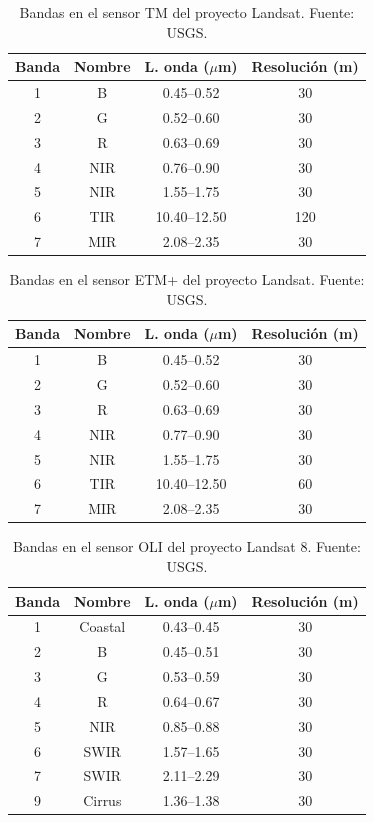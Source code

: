 \begin{table}
	\centering
	\begin{tabular}{@{}cccc@{}}
		\toprule[0.4mm]
		Banda & Nombre & L. onda ($\mu$m) & Resolución (m)\\
		\midrule
		1 & B & 0.45--0.52 & 30 \\
		2 & G & 0.52--0.60 & 30 \\
		3 & R & 0.63--0.69 & 30 \\
		4 & NIR & 0.76--0.90 & 30 \\
		5 & NIR & 1.55--1.75 & 30 \\
		6 & TIR & 10.40--12.50 & 120 \\
		7 & MIR & 2.08--2.35 & 30 \\
		\bottomrule[0.4mm]
	\end{tabular}
	\caption[Bandas en el sensor TM]{Bandas en el sensor TM del proyecto Landsat. Fuente: USGS.}
	\label{tab:sensoresTM}
\end{table}

\begin{table}
	\centering
	\begin{tabular}{@{}cccc@{}}
		\toprule[0.4mm]
		Banda & Nombre & L. onda ($\mu$m) & Resolución (m)\\
		\midrule
		1 & B & 0.45--0.52 & 30 \\
		2 & G & 0.52--0.60 & 30 \\
		3 & R & 0.63--0.69 & 30 \\
		4 & NIR & 0.77--0.90 & 30 \\
		5 & NIR & 1.55--1.75 & 30 \\
		6 & TIR & 10.40--12.50 & 60 \\
		7 & MIR & 2.08--2.35 & 30 \\
		\bottomrule[0.4mm]
	\end{tabular}
	\caption[Bandas en el sensor ETM+]{Bandas en el sensor ETM+ del proyecto Landsat. Fuente: USGS.}
	\label{tab:sensoresETM}
\end{table}

\begin{table}
	\centering
	\begin{tabular}{@{}cccc@{}}
		\toprule[0.4mm]
		Banda & Nombre & L. onda ($\mu$m) & Resolución (m)\\
		\midrule
		1 & Coastal & 0.43--0.45 & 30 \\
		2 & B & 0.45--0.51 & 30 \\
		3 & G & 0.53--0.59 & 30 \\
		4 & R & 0.64--0.67 & 30 \\
		5 & NIR & 0.85--0.88 & 30 \\
		6 & SWIR & 1.57--1.65 & 30 \\
		7 & SWIR & 2.11--2.29 & 30 \\
		9 & Cirrus & 1.36--1.38 & 30 \\
		\bottomrule[0.4mm]
	\end{tabular}
	\caption[Bandas en el sensor OLI]{Bandas en el sensor OLI del proyecto Landsat 8. Fuente: USGS.}
	\label{tab:sensoresOLI}
\end{table}

